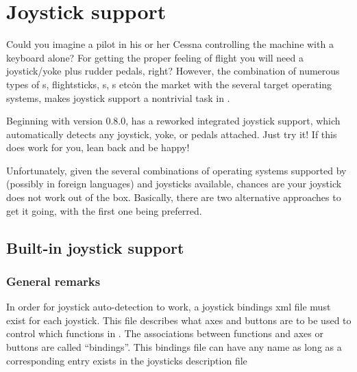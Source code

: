 \section{Joystick support\label{joysticksupp}}
Could you imagine a pilot in his or her Cessna controlling the machine with
a keyboard alone? For getting the proper feeling of flight you will need a
joystick/yoke plus rudder pedals, right? However, the combination of
numerous types of s, flightsticks, s,
s etc\. on the market with the several target operating systems,
makes joystick support a nontrivial task in \FlightGear{}.

Beginning with version 0.8.0, \FlightGear{} has a reworked integrated
joystick support, which automatically detects any joystick, yoke, or pedals
attached. Just try it! If this does work for you, lean back and be happy!

Unfortunately, given the several combinations of operating systems supported
by \FlightGear{} (possibly in foreign languages) and joysticks available,
chances are your joystick does not work out of the box. Basically, there are
two alternative approaches to get it going, with the first one being
preferred.


\subsection{Built-in joystick support\label{joystickbuiltin}}

\subsubsection{General remarks\label{generalremarks}}
In order for joystick auto-detection to work, a joystick bindings xml file
must exist for each joystick. This file describes what axes and buttons are
to be used to control which functions in \FlightGear{}.  The associations
between functions and axes or buttons are called ``bindings''.  This
bindings file can have any name as long as a corresponding entry exists in
the joysticks description file
\medskip


